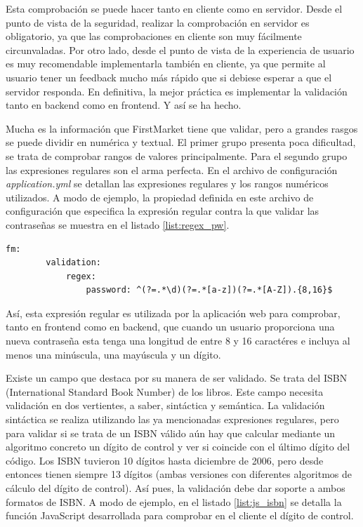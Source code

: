\documentclass[a4paper]{article}
\begin{document}
	Esta comprobación se puede hacer tanto en cliente como en servidor. Desde el punto de vista de la seguridad, realizar la comprobación en servidor es obligatorio, ya que las comprobaciones en cliente son muy fácilmente circunvaladas. Por otro lado, desde el punto de vista de la experiencia de usuario es muy recomendable implementarla también en cliente, ya que permite al usuario tener un feedback mucho más rápido que si debiese esperar a que el servidor responda. En definitiva, la mejor práctica es implementar la validación tanto en backend como en frontend. Y así se ha hecho.
	
	Mucha es la información que FirstMarket tiene que validar, pero a grandes rasgos se puede dividir en numérica y textual. El primer grupo presenta poca dificultad, se trata de comprobar rangos de valores principalmente. Para el segundo grupo las expresiones regulares son el arma perfecta. En el archivo de configuración \emph{application.yml} se detallan las expresiones regulares y los rangos numéricos utilizados. A modo de ejemplo, la propiedad definida en este archivo de configuración que especifica la expresión regular contra la que validar las contraseñas se muestra en el listado \ref{list:regex_pw}.
	\\
	
	\begin{lstlisting}[caption=Expresión regular para las contraseñas,label=list:regex_pw]
	fm:
		validation:
			regex:
				password: ^(?=.*\d)(?=.*[a-z])(?=.*[A-Z]).{8,16}$
	\end{lstlisting}
	
	Así, esta expresión regular es utilizada por la aplicación web para comprobar, tanto en frontend como en backend, que cuando un usuario proporciona una nueva contraseña esta tenga una longitud de entre 8 y 16 caractéres e incluya al menos una minúscula, una mayúscula y un dígito.
	
	Existe un campo que destaca por su manera de ser validado. Se trata del ISBN (International Standard Book Number) de los libros. Este campo necesita validación en dos vertientes, a saber, sintáctica y semántica. La validación sintáctica se realiza utilizando las ya mencionadas expresiones regulares, pero para validar si se trata de un ISBN válido aún hay que calcular mediante un algoritmo concreto un dígito de control y ver si coincide con el último dígito del código. Los ISBN tuvieron 10 dígitos hasta diciembre de 2006, pero desde entonces tienen siempre 13 dígitos (ambas versiones con diferentes algoritmos de cálculo del dígito de control). Así pues, la validación debe dar soporte a ambos formatos de ISBN. A modo de ejemplo, en el listado \ref{list:js_isbn} se detalla la función JavaScript desarrollada para comprobar en el cliente el dígito de control.
	\\
	
\end{document}
